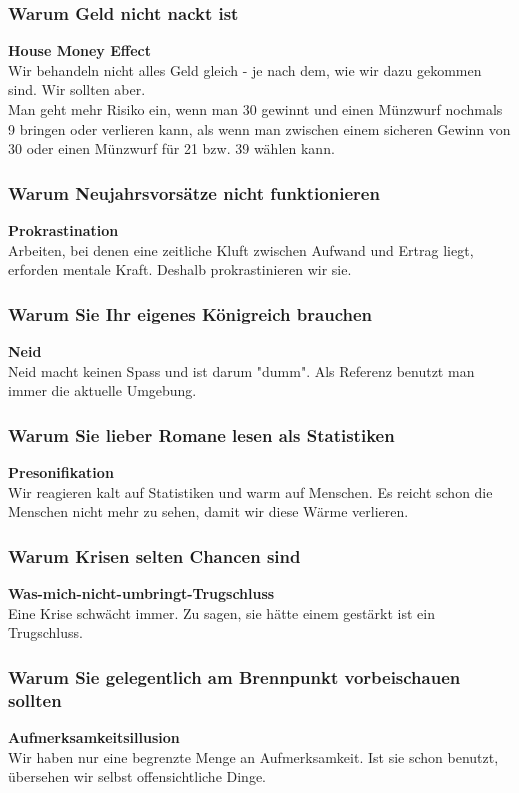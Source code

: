 \documentclass[a4paper, twocolumn]{article}
\begin{document}
\subsubsection*{Warum Geld nicht nackt ist}
\textbf{House Money Effect}\\
Wir behandeln nicht alles Geld gleich - je nach dem, wie wir dazu gekommen sind. Wir sollten aber.\\
Man geht mehr Risiko ein, wenn man 30 gewinnt und einen Münzwurf nochmals 9 bringen oder verlieren kann, als wenn man zwischen einem sicheren Gewinn von 30 oder einen Münzwurf für 21 bzw. 39 wählen kann.

\subsubsection*{Warum Neujahrsvorsätze nicht funktionieren}
\textbf{Prokrastination}\\
Arbeiten, bei denen eine zeitliche Kluft zwischen Aufwand und Ertrag liegt, erforden mentale Kraft. Deshalb prokrastinieren wir sie.

\subsubsection*{Warum Sie Ihr eigenes Königreich brauchen}
\textbf{Neid}\\
Neid macht keinen Spass und ist darum "dumm". Als Referenz benutzt man immer die aktuelle Umgebung.

\subsubsection*{Warum Sie lieber Romane lesen als Statistiken}
\textbf{Presonifikation}\\
Wir reagieren kalt auf Statistiken und warm auf Menschen. Es reicht schon die Menschen nicht mehr zu sehen, damit wir diese Wärme verlieren.

\subsubsection*{Warum Krisen selten Chancen sind}
\textbf{Was-mich-nicht-umbringt-Trugschluss}\\
Eine Krise schwächt immer. Zu sagen, sie hätte einem gestärkt ist ein Trugschluss.

\subsubsection*{Warum Sie gelegentlich am Brennpunkt vorbeischauen sollten}
\textbf{Aufmerksamkeitsillusion}\\
Wir haben nur eine begrenzte Menge an Aufmerksamkeit. Ist sie schon benutzt, übersehen wir selbst offensichtliche Dinge.
\end{document}
